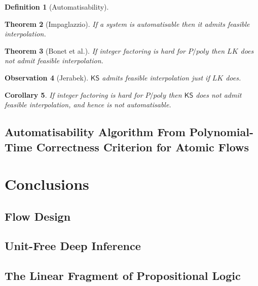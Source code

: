 \documentclass[a4paper]{amsart}
\newtheorem{theorem}{Theorem}
\newtheorem{observation}[theorem]{Observation}
\newtheorem{corollary}[theorem]{Corollary}
\theoremstyle{definition}
\newtheorem{definition}[theorem]{Definition}
\newcommand{\KS}{\mathsf{KS}}
\begin{document}
\begin{definition}[Automatisability]

\end{definition}

\begin{theorem}[Impaglazzio]
If a system is automatisable then it admits feasible interpolation.
\end{theorem}

\begin{theorem}[Bonet et al.]
If integer factoring is hard for $P/poly$ then $LK$ does not admit feasible interpolation.
\end{theorem}

\begin{observation}[Jerabek]
$\KS$ admits feasible interpolation just if $LK$ does.
\end{observation}

\begin{corollary}
If integer factoring is hard for $P/poly$ then $\KS$ does not admit feasible interpolation, and hence is not automatisable.
\end{corollary}

\subsection{Automatisability Algorithm From Polynomial-Time Correctness Criterion for Atomic Flows}

\section{Conclusions}
\subsection{Flow Design}
\subsection{Unit-Free Deep Inference}
\subsection{The Linear Fragment of Propositional Logic}



\end{document}
